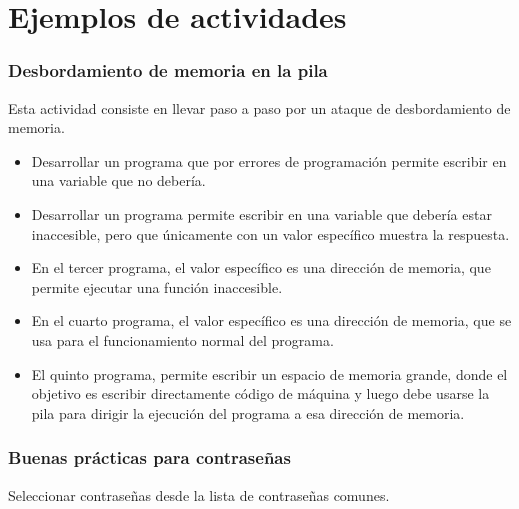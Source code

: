 \documentclass[
  12,
]{scrartcl}
\begin{document}
\hypertarget{ejemplos-de-actividades}{%
\section{Ejemplos de actividades}\label{ejemplos-de-actividades}}

\hypertarget{desbordamiento-de-memoria-en-la-pila}{%
\subsubsection{Desbordamiento de memoria en la
pila}\label{desbordamiento-de-memoria-en-la-pila}}

Esta actividad consiste en llevar paso a paso por un ataque de
desbordamiento de memoria.

\begin{itemize}
\item
  Desarrollar un programa que por errores de programación permite
  escribir en una variable que no debería.
\item
  Desarrollar un programa permite escribir en una variable que debería
  estar inaccesible, pero que únicamente con un valor específico muestra
  la respuesta.
\item
  En el tercer programa, el valor específico es una dirección de
  memoria, que permite ejecutar una función inaccesible.
\item
  En el cuarto programa, el valor específico es una dirección de
  memoria, que se usa para el funcionamiento normal del programa.
\item
  El quinto programa, permite escribir un espacio de memoria grande,
  donde el objetivo es escribir directamente código de máquina y luego
  debe usarse la pila para dirigir la ejecución del programa a esa
  dirección de memoria.
\end{itemize}

\hypertarget{buenas-pruxe1cticas-para-contraseuxf1as}{%
\subsubsection{Buenas prácticas para
contraseñas}\label{buenas-pruxe1cticas-para-contraseuxf1as}}

Seleccionar contraseñas desde la lista de contraseñas comunes.
\end{document}
